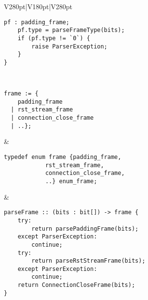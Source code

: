 \documentclass[10pt,a4paper,landscape]{article}
\begin{document}
\begin{longtable}{V{280pt}|V{180pt}|V{280pt}}
\begin{Verbatim}[fontsize=\small]
    pf : padding_frame;
    pf.type = parseFrameType(bits);
    if (pf.type != `0`) {
        raise ParserException;
    }
}
		\end{Verbatim}
	\\ \hline
		\begin{Verbatim}[fontsize=\small]
frame := {
    padding_frame
  | rst_stream_frame
  | connection_close_frame
  | ..};
		\end{Verbatim}
		& 
		\begin{Verbatim}[fontsize=\small]
typedef enum frame {padding_frame, 
            rst_stream_frame, 
            connection_close_frame,
            ..} enum_frame;
		\end{Verbatim}
		 &
		\begin{Verbatim}[fontsize=\small]
parseFrame :: (bits : bit[]) -> frame {
    try:
        return parsePaddingFrame(bits);
    except ParserException:
        continue;
    try:
        return parseRstStreamFrame(bits);
    except ParserException:
        continue;
    return ConnectionCloseFrame(bits);
}
		\end{Verbatim}
	\\
	\bottomrule
	\end{longtable}
\end{document}
